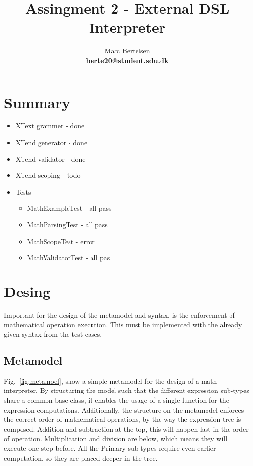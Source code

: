 \documentclass{article}
\begin{document}
\title{Assingment 2 - External DSL Interpreter}
\author{Marc Bertelsen\\
\textbf{berte20@student.sdu.dk}}

\maketitle

\pagebreak

\section{Summary}

\begin{itemize}
    \item XText grammer - done
    \item XTend generator - done
    \item XTend validator - done
    \item XTend scoping - todo
    \item Tests \begin{itemize}
        \item MathExampleTest - all pass
        \item MathParsingTest - all pass
        \item MathScopeTest - error
        \item MathValidatorTest - all pas
    \end{itemize}
\end{itemize}

\section{Desing}

Important for the design of the metamodel and syntax, is the enforcement of mathematical operation execution. This must be implemented with the already given syntax from the test cases.

\subsection{Metamodel}

Fig.~\ref{fig:metamoel}, show a simple metamodel for the design of a math interpreter. By structuring the model such that the different expression sub-types share a common base class, it enables the usage of a single function for the expression computations. Additionally, the structure on the metamodel enforces the correct order of mathematical operations, by the way the expression tree is composed. Addition and subtraction at the top, this will happen last in the order of operation. Multiplication and division are below, which means they will execute one step before. All the Primary sub-types require even earlier computation, so they are placed deeper in the tree.
\end{document}
